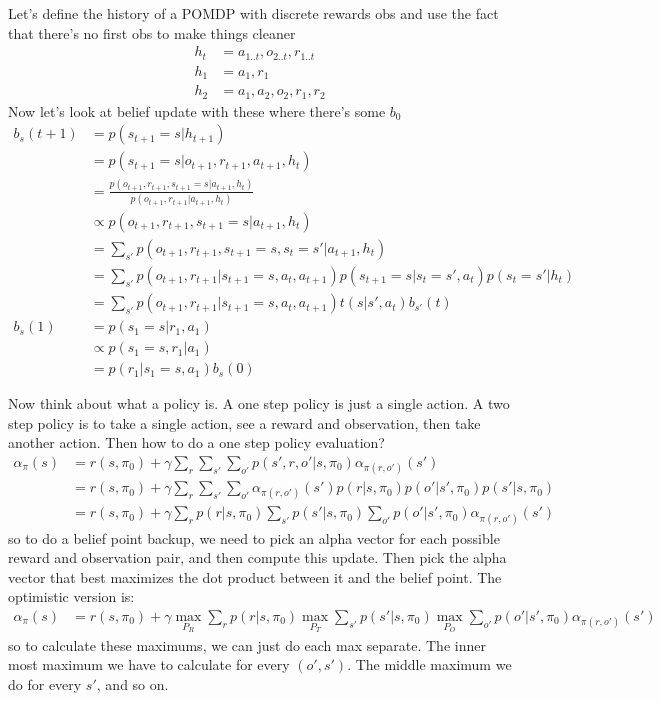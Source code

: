 \documentclass[10pt,english]{article}
\begin{document}
Let's define the history of a POMDP with discrete rewards obs and use the fact that there's no first obs to make things cleaner
\begin{align}
h_t &= a_{1..t},o_{2..t},r_{1..t} \\
h_1 &= a_1,r_1 \\
h_2 &= a_1,a_2,o_2,r_1,r_2
\end{align}
Now let's look at belief update with these where there's some $b_0$
\begin{align}
b_s(t+1) &= p(s_{t+1}=s|h_{t+1}) \\
&= p(s_{t+1}=s|o_{t+1},r_{t+1},a_{t+1},h_{t}) \\
&= \frac{p(o_{t+1},r_{t+1},s_{t+1}=s|a_{t+1},h_{t})}{p(o_{t+1},r_{t+1}|a_{t+1},h_{t})} \\
&\propto {p(o_{t+1},r_{t+1},s_{t+1}=s|a_{t+1},h_{t})} \\
&= \sum_{s'} p(o_{t+1},r_{t+1},s_{t+1}=s,s_t=s'|a_{t+1},h_{t}) \\
&= \sum_{s'} p(o_{t+1},r_{t+1}|s_{t+1}=s,a_t,a_{t+1}) p(s_{t+1}=s|s_t=s',a_{t}) p(s_t=s'|h_{t})\\
&= \sum_{s'} p(o_{t+1},r_{t+1}|s_{t+1}=s,a_t,a_{t+1}) t(s|s',a_t) b_{s'}(t) \\
b_s(1) &= p(s_{1}=s|r_{1},a_{1}) \\
&\propto p(s_{1}=s,r_{1}|a_{1}) \\
&= p(r_{1}|s_{1}=s,a_{1})b_s(0)
\end{align}

Now think about what a policy is. A one step policy is just a single action. A two step policy is to take a single action, see a reward and observation, then take another action. Then how to do a one step policy evaluation?
\begin{align}
\alpha_{\pi}(s) &= r(s,\pi_0) + \gamma\sum_{r}\sum_{s'}\sum_{o'}p(s',r,o'|s,\pi_0)\alpha_{\pi(r,o')}(s') \\
&= r(s,\pi_0) + \gamma\sum_{r}\sum_{s'}\sum_{o'}\alpha_{\pi(r,o')}(s')p(r|s,\pi_0)p(o'|s',\pi_0)p(s'|s,\pi_0) \\
&= r(s,\pi_0) + \gamma\sum_{r}p(r|s,\pi_0)\sum_{s'}p(s'|s,\pi_0)\sum_{o'}p(o'|s',\pi_0)\alpha_{\pi(r,o')}(s')
\end{align}
so to do a belief point backup, we need to pick an alpha vector for each possible reward and observation pair, and then compute this update. Then pick the alpha vector that best maximizes the dot product between it and the belief point. The optimistic version is:
\begin{align}
\alpha_{\pi}(s) &= r(s,\pi_0) + \gamma \max_{P_R} \sum_{r}p(r|s,\pi_0)\max_{P_T} \sum_{s'}p(s'|s,\pi_0) \max_{P_O} \sum_{o'}p(o'|s',\pi_0) \alpha_{\pi(r,o')}(s')
\end{align}
so to calculate these maximums, we can just do each max separate. The inner most maximum we have to calculate for every $(o',s')$. The middle maximum we do for every $s'$, and so on.
\end{document}

